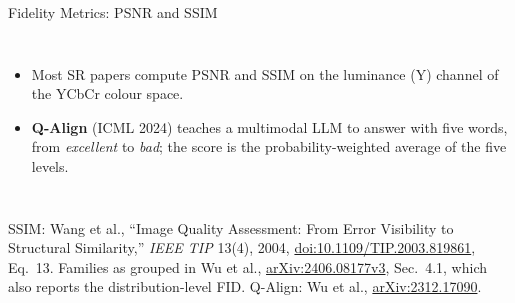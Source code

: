 \begin{frame}{Fidelity Metrics: PSNR and SSIM}
\begin{columns}[T,onlytextwidth]
\begin{itemize}
        \item Most SR papers compute PSNR and SSIM on the luminance (Y) channel of the YCbCr colour space.
        \item \textbf{Q-Align} (ICML 2024) teaches a multimodal LLM to answer with five words, from \emph{excellent} to \emph{bad}; the score is the probability-weighted average of the five levels.
      \end{itemize}
  \end{columns}
  \vspace{0.2em}
  {\scriptsize SSIM: Wang et al., ``Image Quality Assessment: From Error Visibility to Structural Similarity,'' \textit{IEEE TIP} 13(4), 2004, \href{https://doi.org/10.1109/TIP.2003.819861}{doi:10.1109/TIP.2003.819861}, Eq.~13. Families as grouped in Wu et al., \href{https://arxiv.org/abs/2406.08177v3}{arXiv:2406.08177v3}, Sec.~4.1, which also reports the distribution-level FID. Q-Align: Wu et al., \href{https://arxiv.org/abs/2312.17090}{arXiv:2312.17090}.\par}
\end{frame}

